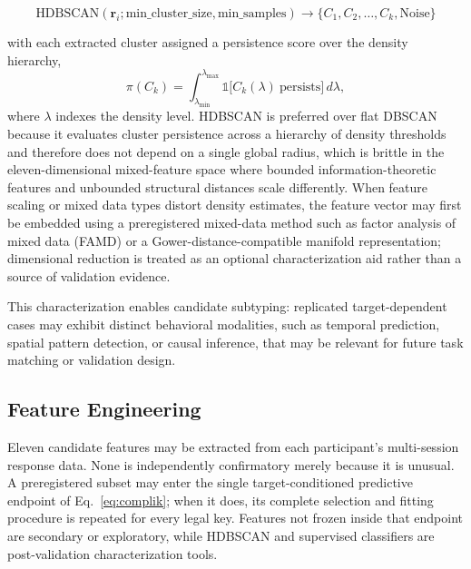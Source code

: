 \documentclass[11pt,letterpaper]{article}
\begin{document}
\begin{equation}
\text{HDBSCAN}(\mathbf{r}_i; \text{min\_cluster\_size}, \text{min\_samples}) \rightarrow \{C_1, C_2, \ldots, C_k, \text{Noise}\}
\label{eq:dbscan}
\end{equation}

with each extracted cluster assigned a persistence score over the density hierarchy,
\begin{equation}
\pi(C_k) = \int_{\lambda_{\min}}^{\lambda_{\max}} \mathbb{1}\big[C_k(\lambda)\ \text{persists}\big]\, d\lambda,
\label{eq:persistence}
\end{equation}
where $\lambda$ indexes the density level. HDBSCAN is preferred over flat DBSCAN because it evaluates cluster persistence across a hierarchy of density thresholds and therefore does not depend on a single global radius, which is brittle in the eleven-dimensional mixed-feature space where bounded information-theoretic features and unbounded structural distances scale differently. When feature scaling or mixed data types distort density estimates, the feature vector may first be embedded using a preregistered mixed-data method such as factor analysis of mixed data (FAMD) or a Gower-distance-compatible manifold representation; dimensional reduction is treated as an optional characterization aid rather than a source of validation evidence.

This characterization enables candidate subtyping: replicated target-dependent cases may exhibit distinct behavioral modalities, such as temporal prediction, spatial pattern detection, or causal inference, that may be relevant for future task matching or validation design.

\subsection{Feature Engineering}

Eleven candidate features may be extracted from each participant's multi-session response data. None is independently confirmatory merely because it is unusual. A preregistered subset may enter the single target-conditioned predictive endpoint of Eq.~\ref{eq:complik}; when it does, its complete selection and fitting procedure is repeated for every legal key. Features not frozen inside that endpoint are secondary or exploratory, while HDBSCAN and supervised classifiers are post-validation characterization tools.
\end{document}
